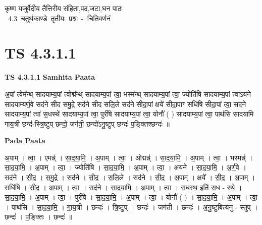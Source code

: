 \documentclass[17pt]{extarticle}
\begin{document}
\begin{titlepage}
    \begin{center}
 
\begin{sanskrit}
    { \Large
    कृष्ण यजुर्वेदीय तैत्तिरीय संहिता,पद,जटा,घन पाठः 
    }
    \\
    \vspace{2.5cm}
    \mbox{ \Large
    4.3      चतुर्थकाण्डे तृतीयः प्रश्नः - चितिवर्णनं   }
\end{sanskrit}
\end{center}

\end{titlepage}
\tableofcontents
{}
\pagebreak


\section{ TS 4.3.1.1 }

\textbf{TS 4.3.1.1 } \newline
\textbf{Samhita Paata} \newline

अ॒पां त्वेम᳚न्थ् सादयाम्य॒पां त्वोद्म᳚न्थ् सादयाम्य॒पां त्वा॒ भस्म᳚न्थ् सादयाम्य॒पां त्वा॒ ज्योति॑षि सादयाम्य॒पां त्वाऽय॑ने सादयाम्यर्ण॒वे सद॑ने सीद समु॒द्रे सद॑ने सीद सलि॒ले सद॑ने सीदा॒पां क्षये॑ सीदा॒पाꣳ सधि॑षि सीदा॒पां त्वा॒ सद॑ने सादयाम्य॒पां त्वा॑ स॒धस्थे॑ सादयाम्य॒पां त्वा॒ पुरी॑षे सादयाम्य॒पां त्वा॒ योनौ॑ ( ) सादयाम्य॒पां त्वा॒ पाथ॑सि सादयामि गाय॒त्री छन्द॑-स्त्रि॒ष्टुप् छन्दो॒ जग॑ती॒ छन्दो॑ऽनु॒ष्टुप् छन्दः॑ प॒ङ्क्तिश्छन्दः॑ ॥ \newline

\textbf{Pada Paata} \newline

अ॒पाम् । त्वा॒ । एमन्न्॑ । सा॒द॒या॒मि॒ । अ॒पाम् । त्वा॒ । ओद्मन्न्॑ । सा॒द॒या॒मि॒ । अ॒पाम् । त्वा॒ । भस्मन्न्॑ । सा॒द॒या॒मि॒ । अ॒पाम् । त्वा॒ । ज्योति॑षि । सा॒द॒या॒मि॒ । अ॒पाम् । त्वा॒ । अय॑ने । सा॒द॒या॒मि॒ । अ॒र्ण॒वे । सद॑ने । सी॒द॒ । स॒मु॒द्रे । सद॑ने । सी॒द॒ । स॒लि॒ले । सद॑ने । सी॒द॒ । अ॒पाम् । क्षये᳚ । सी॒द॒ । अ॒पाम् । सधि॑षि । सी॒द॒ । अ॒पाम् । त्वा॒ । सद॑ने । सा॒द॒या॒मि॒ । अ॒पाम् । त्वा॒ । स॒धस्थ॒ इति॑ स॒ध - स्थे॒ । सा॒द॒या॒मि॒ । अ॒पाम् । त्वा॒ । पुरी॑षे । सा॒द॒या॒मि॒ । अ॒पाम् । त्वा॒ । योनौ᳚ ( ) । सा॒द॒या॒मि॒ । अ॒पाम् । त्वा॒ । पाथ॑सि । सा॒द॒या॒मि॒ । गा॒य॒त्री । छन्दः॑ । त्रि॒ष्टुप् । छन्दः॑ । जग॑ती । छन्दः॑ । अ॒नु॒ष्टुबित्य॑नु - स्तुप् । छन्दः॑ । प॒ङ्क्तिः । छन्दः॑ ॥  \newline
\end{document}
